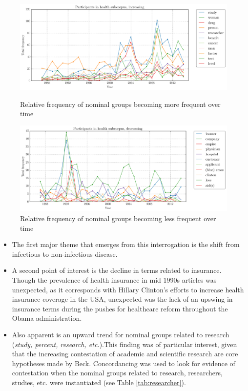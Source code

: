     \begin{figure}[htb!]
    \centering
    \begin{minipage}{.45\textwidth}
    \centering
    \includegraphics[width=1\textwidth]{../images/3.png}
    \caption{Relative frequency of nominal groups becoming more frequent over time}
    \label{fig:3}
    \end{minipage}%
    \begin{minipage}{.45\textwidth}
    \centering
    \includegraphics[width=1\textwidth]{../images/4.png}
    \caption{Relative frequency of nominal groups becoming less frequent over time}
    \label{fig:4}
    \end{minipage}
    \end{figure}


\begin{itemize}
\item The first major theme that emerges from this interrogation is the shift from infectious to non-infectious disease.
\item A second point of interest is the decline in terms related to insurance. Though the prevalence of health insurance in mid 1990s articles was unexpected, as it corresponds with Hillary Clinton's efforts to increase health insurance coverage in the USA, unexpected was the lack of an upswing in insurance terms during the pushes for healthcare reform throughout the Obama administration.
\item Also apparent is an upward trend for nominal groups related to research (\emph{study, percent, research, etc.}).This finding was of particular interest, given that the increasing contestation of academic and scientific research are core hypotheses made by Beck. Concordancing was used to look for evidence of contestation when the nominal groups related to research, researchers, studies, etc. were instantiated (see Table \ref{tab:researcher}).
\end{itemize}

